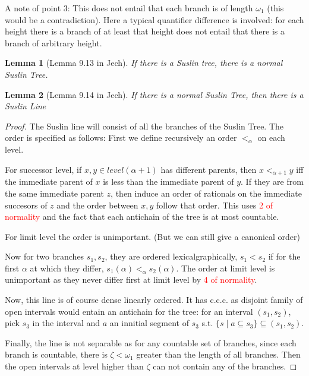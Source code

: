 \documentclass{article}
\newtheorem{lemma}{Lemma}
\begin{document}
A note of point 3: This does not entail that each branch is of length $\omega_1$ (this would be a contradiction). Here a typical quantifier difference is involved: for each height there is a branch of at least that height does not entail that there is a branch of arbitrary height.

\begin{lemma}[Lemma 9.13 in Jech]
    If there is a Suslin tree, there is a normal Suslin Tree.
\end{lemma}

\begin{lemma}[Lemma 9.14 in Jech]
    If there is a normal Suslin Tree, then there is a Suslin Line
\end{lemma}

\begin{proof}
    The Suslin line will consist of all the branches of the Suslin Tree. The order is specified as follows: First we define recursively an order $<_\alpha$ on each level.
    
    For successor level, if $x,y\in level(\alpha+1)$ has different parents, then $x<_{\alpha+1}y$ iff the immediate parent of $x$ is less than the immediate parent of $y$. If they are from the same immediate parent $z$, then induce an order of rationals on the immediate succesors of $z$ and the order between $x,y$ follow that order. This uses \textcolor{red}{ 2 of normality} and the fact that each antichain of the tree is at most countable.

    For limit level the order is unimportant. (But we can still give a canonical order)

    Now for two branches $s_1,s_2$, they are ordered lexicalgraphically, $s_1<s_2$ if for the first $\alpha$ at which they differ, $s_1(\alpha)<_\alpha s_2(\alpha)$. The order at limit level is unimportant as they never differ first at limit level by \textcolor{red}{4 of normality}.

    Now, this line is of course dense linearly ordered. It has c.c.c. as disjoint family of open intervals would entain an antichain for the tree: for an interval $(s_1,s_2)$, pick $s_3$ in the interval and $a$ an innitial segment of $s_3$ s.t. $\{s\mid a\subseteq s_3\}\subseteq (s_1,s_2)$.

    Finally, the line is not separable as for any countable set of branches, since each branch is countable, there is $\zeta<\omega_1$ greater than the length of all branches. Then the open intervals at level higher than $\zeta$ can not contain any of the branches.
\end{proof}
\end{document}

